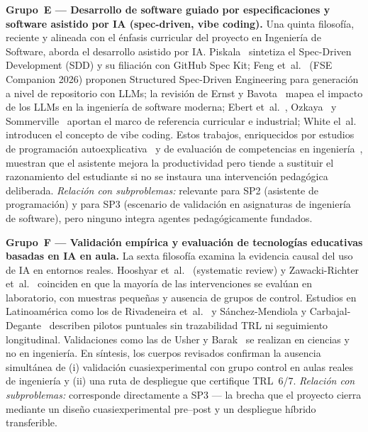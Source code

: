 \textbf{Grupo~E — Desarrollo de software guiado por especificaciones y software asistido por IA (spec-driven, vibe coding).}
Una quinta filosofía, reciente y alineada con el énfasis curricular del proyecto en Ingeniería de Software, aborda el desarrollo asistido por IA. Piskala~\cite{piskala2026sdd} sintetiza el Spec-Driven Development (SDD) y su filiación con GitHub Spec Kit; Feng et~al.~\cite{feng2026ssde} (FSE Companion 2026) proponen Structured Spec-Driven Engineering para generación a nivel de repositorio con LLMs; la revisión de Ernst y Bavota~\cite{ernst_bavota_2024} mapea el impacto de los LLMs en la ingeniería de software moderna; Ebert et~al.~\cite{ebert_2021}, Ozkaya~\cite{ozkaya_2023} y Sommerville~\cite{sommerville_2015} aportan el marco de referencia curricular e industrial; White el~al.~\cite{white_2023vibe} introducen el concepto de vibe coding. Estos trabajos, enriquecidos por estudios de programación autoexplicativa~\cite{lin_huang_lu_2023} y de evaluación de competencias en ingeniería~\cite{ushar_barak_2024,rivadeneira_2025}, muestran que el asistente mejora la productividad pero tiende a sustituir el razonamiento del estudiante si no se instaura una intervención pedagógica deliberada. \emph{Relación con subproblemas:} relevante para SP2 (asistente de programación) y para SP3 (escenario de validación en asignaturas de ingeniería de software), pero ninguno integra agentes pedagógicamente fundados.

\textbf{Grupo~F — Validación empírica y evaluación de tecnologías educativas basadas en IA en aula.}
La sexta filosofía examina la evidencia causal del uso de IA en entornos reales. Hooshyar et~al.~\cite{hooshyar2024systematic} (systematic review) y Zawacki-Richter et~al.~\cite{zawacki2019systematic} coinciden en que la mayoría de las intervenciones se evalúan en laboratorio, con muestras pequeñas y ausencia de grupos de control. Estudios en Latinoamérica como los de Rivadeneira et~al.~\cite{rivadeneira_2025} y Sánchez-Mendiola y Carbajal-Degante~\cite{sanchez_mendiola_2023} describen pilotos puntuales sin trazabilidad TRL ni seguimiento longitudinal. Validaciones como las de Usher y Barak~\cite{ushar_barak_2024} se realizan en ciencias y no en ingeniería. En síntesis, los cuerpos revisados confirman la ausencia simultánea de (i) validación cuasiexperimental con grupo control en aulas reales de ingeniería y (ii) una ruta de despliegue que certifique TRL~6/7. \emph{Relación con subproblemas:} corresponde directamente a SP3 — la brecha que el proyecto cierra mediante un diseño cuasiexperimental pre--post y un despliegue híbrido transferible.

